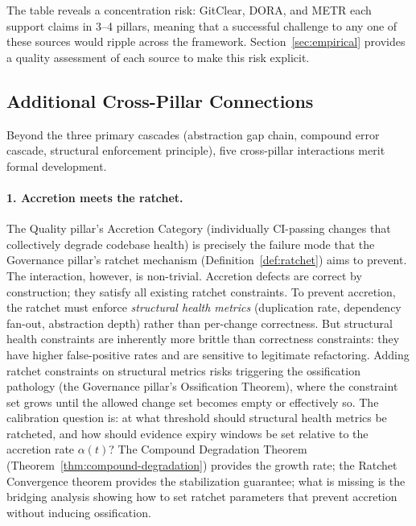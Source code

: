\documentclass[11pt, a4paper, logo, copyright]{googledeepmind}
\begin{document}
The table reveals a concentration risk: GitClear, DORA, and METR each support claims in 3--4 pillars, meaning that a successful challenge to any one of these sources would ripple across the framework. Section~\ref{sec:empirical} provides a quality assessment of each source to make this risk explicit.

\subsection{Additional Cross-Pillar Connections}
\label{sec:missed-connections}

Beyond the three primary cascades (abstraction gap chain, compound error cascade, structural enforcement principle), five cross-pillar interactions merit formal development.

\paragraph{1. Accretion meets the ratchet.}
The Quality pillar's Accretion Category (individually CI-passing changes that collectively degrade codebase health) is precisely the failure mode that the Governance pillar's ratchet mechanism (Definition~\ref{def:ratchet}) aims to prevent. The interaction, however, is non-trivial. Accretion defects are correct by construction; they satisfy all existing ratchet constraints. To prevent accretion, the ratchet must enforce \emph{structural health metrics} (duplication rate, dependency fan-out, abstraction depth) rather than per-change correctness. But structural health constraints are inherently more brittle than correctness constraints: they have higher false-positive rates and are sensitive to legitimate refactoring. Adding ratchet constraints on structural metrics risks triggering the ossification pathology (the Governance pillar's Ossification Theorem), where the constraint set grows until the allowed change set becomes empty or effectively so. The calibration question is: at what threshold should structural health metrics be ratcheted, and how should evidence expiry windows be set relative to the accretion rate $\alpha(t)$? The Compound Degradation Theorem (Theorem~\ref{thm:compound-degradation}) provides the growth rate; the Ratchet Convergence theorem provides the stabilization guarantee; what is missing is the bridging analysis showing how to set ratchet parameters that prevent accretion without inducing ossification.
\end{document}
